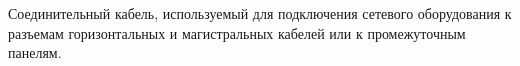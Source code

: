 Соединительный кабель, используемый для подключения
сетевого оборудования к разъемам горизонтальных и магистральных
кабелей или к промежуточным панелям.